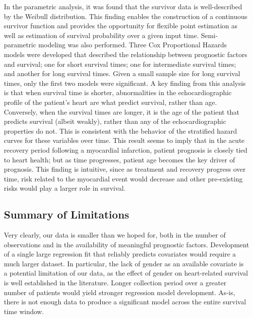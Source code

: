 \documentclass[
]{article}
\begin{document}
In the parametric analysis, it was found that the survivor data is
well-described by the Weibull distribution. This finding enables the
construction of a continuous survivor function and provides the
opportunity for flexible point estimation as well as estimation of
survival probability over a given input time. Semi-parametric modeling
was also performed. Three Cox Proportional Hazards models were developed
that described the relationship between prognostic factors and survival;
one for short survival times; one for intermediate survival times; and
another for long survival times. Given a small sample size for long
survival times, only the first two models were significant. A key
finding from this analysis is that when survival time is shorter,
abnormalities in the echocardiographic profile of the patient's heart
are what predict survival, rather than age. Conversely, when the
survival times are longer, it is the age of the patient that predicts
survival (albeit weakly), rather than any of the echocardiographic
properties do not. This is consistent with the behavior of the
stratified hazard curves for these variables over time. This result
seems to imply that in the acute recovery period following a myocardial
infarction, patient prognosis is closely tied to heart health; but as
time progresses, patient age becomes the key driver of prognosis. This
finding is intuitive, since as treatment and recovery progress over
time, risk related to the myocardial event would decrease and other
pre-existing risks would play a larger role in survival.

\hypertarget{summary-of-limitations}{%
\subsection{Summary of Limitations}\label{summary-of-limitations}}

Very clearly, our data is smaller than we hoped for, both in the number
of observations and in the availability of meaningful prognostic
factors. Development of a single large regression fit that reliably
predicts covariates would require a much larger dataset. In particular,
the lack of gender as an available covariate is a potential limitation
of our data, as the effect of gender on heart-related survival is well
established in the literature. Longer collection period over a greater
number of patients would yield stronger regression model development.
As-is, there is not enough data to produce a significant model across
the entire survival time window.
\end{document}
